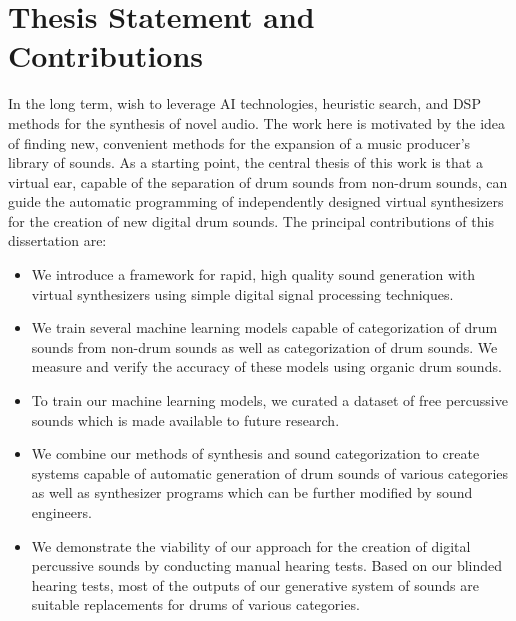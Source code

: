 \documentclass[\main/thesis.tex]{subfiles}
\begin{document}
\section{Thesis Statement and Contributions}
In the long term, wish to leverage AI technologies, heuristic search, and DSP methods for the synthesis of novel audio. The work here is motivated by the idea of finding new, convenient methods for the expansion of a music producer's library of sounds. As a starting point, the central thesis of this work is that a virtual ear, capable of the separation of drum sounds from non-drum sounds, can guide the automatic programming of independently designed virtual synthesizers for the creation of new digital drum sounds. The principal contributions of this dissertation are:
\begin{itemize}
  \item We introduce a framework for rapid, high quality sound generation with virtual synthesizers using simple digital signal processing techniques. 
  \item We train several machine learning models capable of categorization of drum sounds from non-drum sounds as well as categorization of drum sounds. We measure and verify the accuracy of these models using organic drum sounds. 
  \item To train our machine learning models, we curated a dataset of free percussive sounds which is made available to future research. 
  \item We combine our methods of synthesis and sound categorization to create systems capable of automatic generation of drum sounds of various categories as well as synthesizer programs which can be further modified by sound engineers.
  \item We demonstrate the viability of our approach for the creation of digital percussive sounds by conducting manual hearing tests. Based on our blinded hearing tests, most of the outputs of our generative system of sounds are suitable replacements for drums of various categories. 
\end{itemize}



\end{document}
